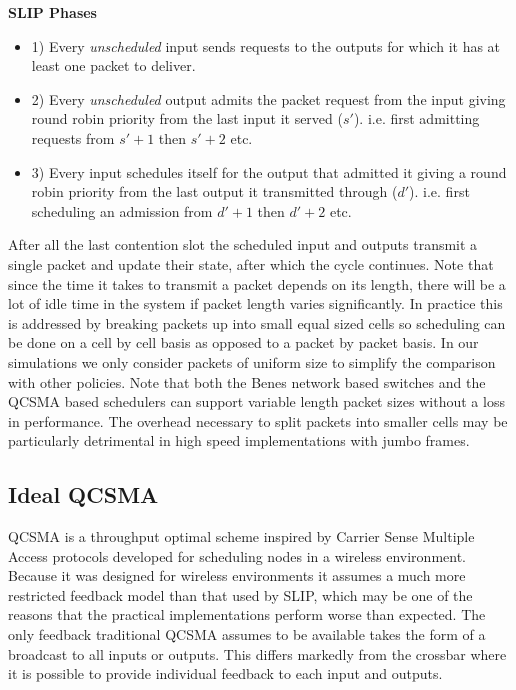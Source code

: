 \documentclass{IEEEtran}%
\begin{document}
{\bf SLIP Phases}
\begin{itemize}
\item 1) Every {\it unscheduled} input sends requests to the outputs for which it has at least one packet to deliver.
\item 2) Every {\it unscheduled} output admits the packet request from the input giving round robin priority from the last input it served ($s'$). i.e. first admitting requests from $s'+1$ then $s'+2$ etc.
\item 3) Every input schedules itself for the output that admitted it giving a round robin priority from the last output it transmitted through ($d'$).  i.e. first scheduling an admission from $d'+1$ then $d'+2$ etc.\\
\end{itemize}

After all the last contention slot the scheduled input and outputs transmit a single packet and update their state, after which the cycle continues.  Note that since the time it takes to transmit a packet depends on its length, there will be a lot of idle time in the system if packet length varies significantly.  In practice this is addressed by breaking packets up into small equal sized cells so scheduling can be done on a cell by cell basis as opposed to a packet by packet basis.  In our simulations we only consider packets of uniform size to simplify the comparison with other policies.  Note that both the Benes network based switches and the QCSMA based schedulers can support variable length packet sizes without a loss in performance.  The overhead necessary to split packets into smaller cells may be particularly detrimental in high speed implementations with jumbo frames.

\subsection{Ideal QCSMA}


QCSMA is a throughput optimal scheme inspired by Carrier Sense Multiple Access protocols developed for scheduling nodes in a wireless environment.  Because it was designed for wireless environments it assumes a much more restricted feedback model than that used by SLIP, which may be one of the reasons that the practical implementations perform worse than expected.  The only feedback traditional QCSMA assumes to be available takes the form of a broadcast to all inputs or outputs. This differs markedly from the crossbar where it is possible to provide individual feedback to each input and outputs.%
\end{document}
